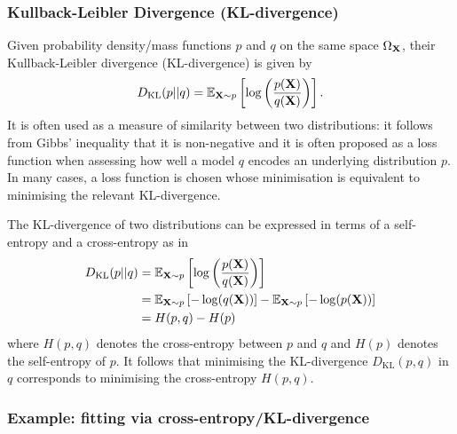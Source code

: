 \documentclass[11pt]{article}
\begin{document}
\begin{appendices}
\subsubsection{Kullback-Leibler Divergence (KL-divergence)}

Given probability density/mass functions $p$ and $q$ on the same space $\Omega_{\mathbf{X}}$, their Kullback-Leibler divergence (KL-divergence) is given by
$$
D_{\text{KL}}(p||q)
=
\mathbb{E}_{\mathbf{X}\sim p}\left[\log\left(\frac{p(\mathbf{X})}{q(\mathbf{X})}\right)\right].
$$
It is often used as a measure of similarity between two distributions: it follows from Gibbs' inequality that it is non-negative and it is often proposed as a loss function when assessing how well a model $q$ encodes an underlying distribution $p$. In many cases, a loss function is chosen whose minimisation is equivalent to minimising the relevant KL-divergence.

The KL-divergence of two distributions can be expressed in terms of a self-entropy and a cross-entropy as in
\begin{align*}
    D_{\text{KL}}(p||q)
    &=
    \mathbb{E}_{\mathbf{X}\sim p}\left[\log\left(\frac{p(\mathbf{X})}{q(\mathbf{X})}\right)\right]\\
    &=
    \mathbb{E}_{\mathbf{X}\sim p}\left[-\log(q(\mathbf{X}))\right]-\mathbb{E}_{\mathbf{X}\sim p}\left[-\log(p(\mathbf{X}))\right]\\
    &=
    H(p,q)-H(p)
\end{align*}
where $H(p,q)$ denotes the cross-entropy between $p$ and $q$ and $H(p)$ denotes the self-entropy of $p$. It follows that minimising the KL-divergence $D_{\text{KL}}(p,q)$ in $q$ corresponds to minimising the cross-entropy $H(p,q)$.

\subsubsection*{Example: fitting via cross-entropy/KL-divergence}


\end{appendices}
\end{document}

